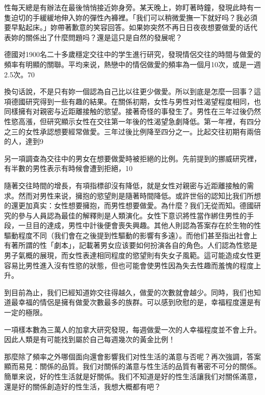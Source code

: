 \documentclass[12pt,UTF8]{ctexbook}
\begin{document}
性每天總是有辦法在最後悄悄接近妳身旁。某天晚上，妳盯著時鐘，發現此時有一隻迫切的手緩緩地伸入妳的彈性內褲裡。「我们可以稍微愛撫一下就好吗？我必須要早點起床。」妳帶著歉意的笑容回答。如果妳突然不再日日夜夜想要做愛的话代表妳的關係出了什麼問題吗？還是這只是自然的發展呢？

德國对1900名二十多歲穩定交往中的学生進行研究，發現情侶交往的時間与做愛的頻率有明顯的關聯。平均来说，熱戀中的情侶做愛的頻率為一個月10次，或是一週2.5次。70%

換句话說，不是只有妳一個認為自己比以往更少做愛。所以到底是怎麼一回事？這項德國研究得到一些有趣的結果。在關係初期，女性与男性对性渴望程度相同，也同樣擁有对親密与近距離接触的慾望。接著奇怪的事發生了。男性在三年过後仍然性慾高漲，但研究顯示女性在交往第一年後的性渴望急劇降低。第一年裡，有四分之三的女性承認想要經常做愛。三年过後比例降至四分之一。比起交往初期有兩倍的人，達到9%

另一項調查為交往中的男女在想要做愛時被拒絕的比例。先前提到的挪威研究裡，有半數的男性表示有時候會遭到拒絕，10%

隨著交往時間的增長，有項指標卻沒有降低，就是女性对親密与近距離接触的需求。然而对男性来说，擁抱的慾望則是隨著時間降低。或許世俗的認知比我们所想的還更加真实：女性想要擁抱，而男性想要做愛。為什麼？我们无從而知。德國研究的參与人員認為最佳的解釋則是人類演化。女性下意识將性當作綁住男性的手段，一旦目的達成，男性中計後便會喪失興趣。其他人則認為答案存在於生物的性驅動程度不同（我们會在之後提到性驅動的影響有多遠）。而他们甚至指出社會上有著所謂的性「劇本」，記載著男女应该要如何扮演各自的角色。人们認為性慾是男子氣概的展現，而女性表達相同程度的慾望則有失女子風範。這可能造成女性更容易比男性進入沒有性慾的狀態，但也可能會使男性因為失去性趣而羞愧的程度上升。

到目前為止，我们已經知道妳交往得越久，做愛的次數就會越少。同時，我们也知道最幸福的情侶是擁有做愛次數最多的族群。可以感到欣慰的是，幸福程度還是有一定的極限。

一項樣本數為三萬人的加拿大研究發現，每週做愛一次的人幸福程度並不會上升。因此人類是有可能找到屬於自己每週幾次的黃金比例！

那麼除了頻率之外哪個面向還會影響我们对性生活的滿意与否呢？再次強調，答案顯而易見：關係的品質。我们对關係的滿意与性生活的品質有著密不可分的關係。簡單来说，好的性生活就是好關係。我们不知道是好的性生活讓我们对關係滿意，還是好的關係創造好的性生活，我想大概都有吧？
\end{document}
